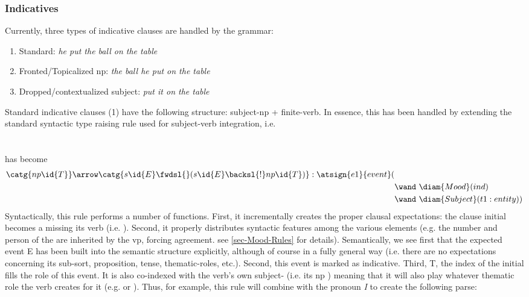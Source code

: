 \subsubsection{Indicatives}
Currently, three types of indicative clauses are handled by the grammar:
\begin{enumerate}
\item Standard: \emph{he put the ball on the table}  
\item Fronted/Topicalized np: \emph{the ball he put on the table} 
\item Dropped/contextualized subject: \emph{put it on the table}
\end{enumerate}
Standard indicative clauses (1) have the following structure: subject-np + finite-verb. In essence, this has been handled by extending the standard syntactic type raising rule used for subject-verb integration, i.e.  \\

 \arrow {} \\\\
has become \\
\vspace{-1.5em} %
\begin{align*}
\catg{np\id{T} }  \arrow  \catg{s\id{E} \fwdsl{} (s\id{E} \backsl{!} np\id{T} )}  :  \atsign{e1}{event}(&   \\ 
      & \wand\ \diam{Mood}(ind) \\
      & \wand\ \diam{Subject}(t1:entity ) )
\end{align*}
Syntactically, this rule performs a number of functions. First, it incrementally creates the proper clausal expectations: the clause initial  becomes a  missing its verb (i.e. ). Second, it properly distributes syntactic features among the various elements (e.g. the number and person of the  are inherited by the vp, forcing agreement. see \ref{sec-Mood-Rules} for details). Semantically, we see first that the expected event  E has been built into the semantic structure explicitly, although of course in a fully general way (i.e. there are no expectations concerning its sub-sort, proposition, tense, thematic-roles, etc.). Second, this event is marked as indicative. Third, T, the index of the initial  fills the  role of this event. It is also co-indexed with the verb's own subject- (i.e. its  \backsl{!} np ) meaning that it will also play whatever thematic role the verb creates for it (e.g.  or ).
Thus, for example, this rule will combine with the pronoun \emph{I} to create the following parse: \\

